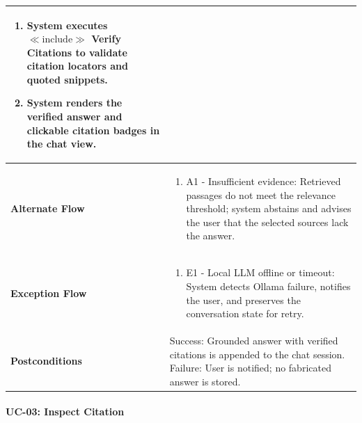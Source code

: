 \begin{longtable}{>{\raggedright\arraybackslash}p{}>{\raggedright\arraybackslash}p{}}
\begin{enumerate}[nosep,leftmargin=*,label=\arabic*.]
    \item System executes $\ll\text{include}\gg$ Verify Citations to validate citation locators and quoted snippets.

    \item System renders the verified answer and clickable citation badges in the chat view.

\end{enumerate} \\ \hline

\textbf{Alternate Flow} & \begin{enumerate}[nosep,leftmargin=*,label=\arabic*.]

    \item A1 - Insufficient evidence: Retrieved passages do not meet the relevance threshold; system abstains and advises the user that the selected sources lack the answer.

\end{enumerate} \\ \hline

\textbf{Exception Flow} & \begin{enumerate}[nosep,leftmargin=*,label=\arabic*.]

    \item E1 - Local LLM offline or timeout: System detects Ollama failure, notifies the user, and preserves the conversation state for retry.

\end{enumerate} \\ \hline

\textbf{Postconditions} & Success: Grounded answer with verified citations is appended to the chat session. Failure: User is notified; no fabricated answer is stored. \\ \hline

\end{longtable}

\endgroup





\paragraph*{UC-03: Inspect Citation}

\begingroup

\small

\setlength{\tabcolsep}{5pt}

\renewcommand{\arraystretch}{1.1}

